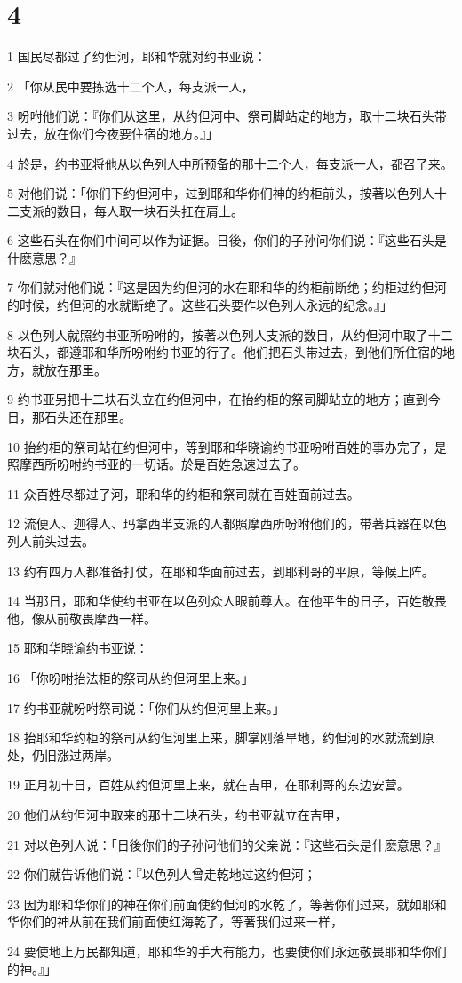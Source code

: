 \chapter{4}

\par 1 国民尽都过了约但河，耶和华就对约书亚说：
\par 2 「你从民中要拣选十二个人，每支派一人，
\par 3 吩咐他们说：『你们从这里，从约但河中、祭司脚站定的地方，取十二块石头带过去，放在你们今夜要住宿的地方。』」
\par 4 於是，约书亚将他从以色列人中所预备的那十二个人，每支派一人，都召了来。
\par 5 对他们说：「你们下约但河中，过到耶和华你们神的约柜前头，按著以色列人十二支派的数目，每人取一块石头扛在肩上。
\par 6 这些石头在你们中间可以作为证据。日後，你们的子孙问你们说：『这些石头是什麽意思？』
\par 7 你们就对他们说：『这是因为约但河的水在耶和华的约柜前断绝；约柜过约但河的时候，约但河的水就断绝了。这些石头要作以色列人永远的纪念。』」
\par 8 以色列人就照约书亚所吩咐的，按著以色列人支派的数目，从约但河中取了十二块石头，都遵耶和华所吩咐约书亚的行了。他们把石头带过去，到他们所住宿的地方，就放在那里。
\par 9 约书亚另把十二块石头立在约但河中，在抬约柜的祭司脚站立的地方；直到今日，那石头还在那里。
\par 10 抬约柜的祭司站在约但河中，等到耶和华晓谕约书亚吩咐百姓的事办完了，是照摩西所吩咐约书亚的一切话。於是百姓急速过去了。
\par 11 众百姓尽都过了河，耶和华的约柜和祭司就在百姓面前过去。
\par 12 流便人、迦得人、玛拿西半支派的人都照摩西所吩咐他们的，带著兵器在以色列人前头过去。
\par 13 约有四万人都准备打仗，在耶和华面前过去，到耶利哥的平原，等候上阵。
\par 14 当那日，耶和华使约书亚在以色列众人眼前尊大。在他平生的日子，百姓敬畏他，像从前敬畏摩西一样。
\par 15 耶和华晓谕约书亚说：
\par 16 「你吩咐抬法柜的祭司从约但河里上来。」
\par 17 约书亚就吩咐祭司说：「你们从约但河里上来。」
\par 18 抬耶和华约柜的祭司从约但河里上来，脚掌刚落旱地，约但河的水就流到原处，仍旧涨过两岸。
\par 19 正月初十日，百姓从约但河里上来，就在吉甲，在耶利哥的东边安营。
\par 20 他们从约但河中取来的那十二块石头，约书亚就立在吉甲，
\par 21 对以色列人说：「日後你们的子孙问他们的父亲说：『这些石头是什麽意思？』
\par 22 你们就告诉他们说：『以色列人曾走乾地过这约但河；
\par 23 因为耶和华你们的神在你们前面使约但河的水乾了，等著你们过来，就如耶和华你们的神从前在我们前面使红海乾了，等著我们过来一样，
\par 24 要使地上万民都知道，耶和华的手大有能力，也要使你们永远敬畏耶和华你们的神。』」

